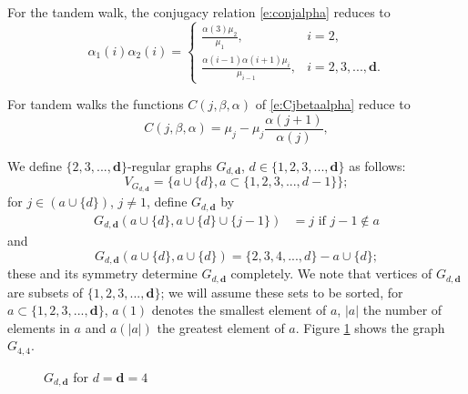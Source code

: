 \documentclass[11pt,a4paper]{article}
\newcommand{\insfig}[3]{
\begin{figure}[h]
\begin{center}
\scalebox{#3}{
\centerline{}}
\end{center}


\vspace{-0.65cm}
\caption{\hspace{0.25cm}#2\label{f:#1}}
\end{figure}
}
\begin{document}
For the tandem walk, the conjugacy relation \eqref{e:conjalpha}
reduces to
\begin{equation}\label{e:conja1toa2t}
\alpha_1(i)\alpha_2(i)
=
\begin{cases}
\frac{\alpha(3)\mu_2}{\mu_1}, & i =2, \\
\frac{\alpha(i-1)\alpha(i+1)\mu_i}{\mu_{i-1}}, &i=2,3,...,{\bm d}.
\end{cases}
\end{equation}

For tandem walks the functions $C(j, \beta,\alpha)$ of 
\eqref{e:Cjbetaalpha} reduce to 
\begin{equation}\label{e:Cjbetaalphatandem}
C(j,\beta,\alpha) = 
\mu_j - \mu_j \frac{ \alpha(j+1)}{\alpha(j)},
\end{equation}

We define $\{2,3,...,{\bm d}\}$-regular graphs $G_{d,{\bm d}}$, $ d \in \{1,2,3,...,{\boldsymbol d}\}$ as follows:
\begin{equation}\label{d:defVGd}
V_{G_{d,{\bm d}}} = \{ a\cup\{ d\}, a \subset \{1,2,3,...,d-1\}\};
\end{equation}
for $j \in (a \cup \{d\})$, $j \neq 1$, define $G_{d,{\bm d}}$ by
\begin{align}\label{d:defGd}
G_{d,{\bm d}}( a\cup\{d\}, a\cup \{d\} \cup \{j-1\}) &= j \text{ if } j-1 \notin a 
\end{align}
and
\begin{equation}\label{e:Gdloops}
G_{d,{\bm d}}( a\cup \{d\}, a \cup \{d\}) = \{2,3,4,...,d\}- a \cup \{d\};
\end{equation}
these and its symmetry determine $G_{d,{\bm d}}$ completely.
We note that vertices of $G_{d,{\bm d}}$ are subsets
of $\{1,2,3,...,{\bm d}\}$; we will assume
these sets to be sorted, for $a \subset \{1,2,3,...,{\bm d}\}$,
$a(1)$ denotes the smallest element of $a$, $|a|$ the number of elements
in $a$ and $a(|a|)$ the greatest element of $a$.
Figure \ref{f:G4tex} shows the graph $G_{4,4}$.


\insfig{G4tex}{$G_{d,{\bm d}}$ for $d={\bm d}=4$}{0.8}
\end{document}
